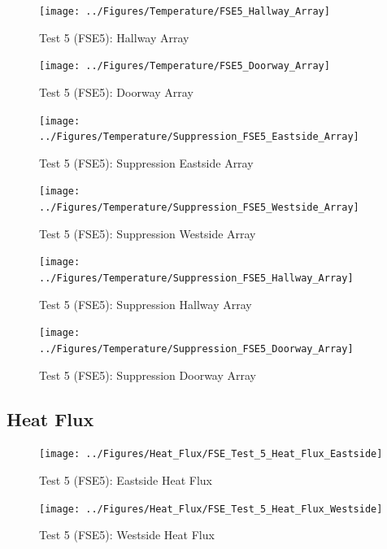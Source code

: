 \documentclass[12pt,oneside]{book}
\begin{document}
\begin{figure}[!ht]
	\texttt{[image: ../Figures/Temperature/FSE5\_Hallway\_Array]}
	\caption{Test 5 (FSE5): Hallway Array}
	\label{fig:Test_5_Hallway_Array}
\end{figure}

\begin{figure}[!ht]
	\texttt{[image: ../Figures/Temperature/FSE5\_Doorway\_Array]}
	\caption{Test 5 (FSE5): Doorway Array}
	\label{fig:Test_5_Doorway_Array}
\end{figure}

\begin{figure}[!ht]
	\texttt{[image: ../Figures/Temperature/Suppression\_FSE5\_Eastside\_Array]}
	\caption{Test 5 (FSE5): Suppression Eastside Array}
	\label{fig:Test_5_Suppression_Eastside_Array}
\end{figure}

\begin{figure}[!ht]
	\texttt{[image: ../Figures/Temperature/Suppression\_FSE5\_Westside\_Array]}
	\caption{Test 5 (FSE5): Suppression Westside Array}
	\label{fig:Test_5_Suppression_Westside_Array}
\end{figure}

\begin{figure}[!ht]
	\texttt{[image: ../Figures/Temperature/Suppression\_FSE5\_Hallway\_Array]}
	\caption{Test 5 (FSE5): Suppression Hallway Array}
	\label{fig:Test_5_Suppression_Hallway_Array}
\end{figure}

\begin{figure}[!ht]
	\texttt{[image: ../Figures/Temperature/Suppression\_FSE5\_Doorway\_Array]}
	\caption{Test 5 (FSE5): Suppression Doorway Array}
	\label{fig:Test_5_Suppression_Doorway_Array}
\end{figure}

\subsection{Heat Flux}
\label{subsec:Heat_Flux}

\begin{figure}[!ht]
	\texttt{[image: ../Figures/Heat\_Flux/FSE\_Test\_5\_Heat\_Flux\_Eastside]}
	\caption{Test 5 (FSE5): Eastside Heat Flux}
	\label{fig:Test_5_Eastside_Heat_Flux}
\end{figure}

\begin{figure}[!ht]
	\texttt{[image: ../Figures/Heat\_Flux/FSE\_Test\_5\_Heat\_Flux\_Westside]}
	\caption{Test 5 (FSE5): Westside Heat Flux}
	\label{fig:Test_5_Westside_Heat_Flux}
\end{figure}
\end{document}
